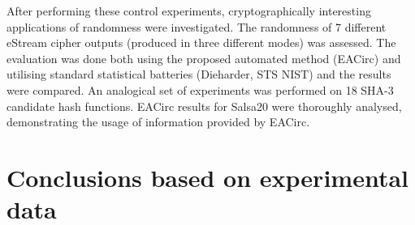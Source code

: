 \documentclass[12pt,oneside]{fithesis2}		%
\renewcommand{\_}{\leavevmode \kern0.0em\vbox{\hrule width0.4em}}
\begin{document}
After performing these control experiments, cryptographically interesting applications of randomness were investigated.
The randomness of 7 different eStream cipher outputs (produced in three different modes) was assessed.
The evaluation was done both using the proposed automated method (EACirc) and utilising standard statistical batteries
(Dieharder, STS NIST) and the results were compared. An analogical set of experiments was performed 
on 18 SHA-3 candidate hash functions.
EACirc results for Salsa20 were thoroughly analysed, demonstrating the usage of information provided by EACirc.

\section{Conclusions based on experimental data}
\label{sec:outro-conclusions}
\end{document}
